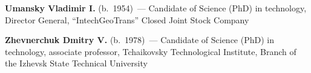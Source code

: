 \begin{multicols}{2}
\vspace*{6pt}

\noindent
\textbf{Umansky Vladimir I.} (b.\ 1954)~--- Candidate of Science (PhD) in technology, 
Director General, ``IntechGeoTrans'' Closed Joint Stock Company

\vspace*{6pt}

\noindent
\textbf{Zhevnerchuk Dmitry V.} (b.\ 1978)~--- Candidate of Science (PhD) in technology, 
associate professor, Tchaikovsky Technological Institute, Branch of the Izhevsk State 
Technical University


\def\leftfootline{\small{\textbf{\thepage}
\hfill ИНФОРМАТИКА И ЕЁ ПРИМЕНЕНИЯ\ \ \ том~6\ \ \ выпуск~2\ \ \ 2012}
}%
 \def\rightfootline{\small{ИНФОРМАТИКА И ЕЁ ПРИМЕНЕНИЯ\ \ \ том~6\ \ \ выпуск~2\ \ \ 2012
\hfill \textbf{\thepage}}}




\end{multicols}
\newpage